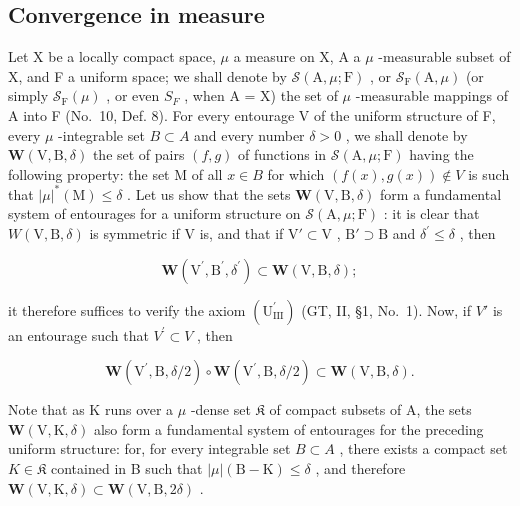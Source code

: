 \subsection{Convergence in measure}

Let X be a locally compact space, \(\mu\) a measure on X, A a \(\mu\) -measurable subset of X, and F a uniform space; we shall denote by \(\mathcal{S}(\mathrm{A},\mu;\mathrm{F})\) , or \(\mathcal{S}_{\mathrm{F}}(\mathrm{A},\mu)\) (or simply \(\mathcal{S}_{\mathrm{F}}(\mu)\) , or even \(S_{F}\) , when A = X) the set of \(\mu\) -measurable mappings of A into F (No.~10, Def. 8). For every entourage V of the uniform structure of F, every \(\mu\) -integrable set \(B \subset A\) and every number \(\delta > 0\) , we shall denote by \(\boldsymbol{W}(\mathrm{V},\mathrm{B},\delta)\) the set of pairs \((f,g)\) of functions in \(\mathcal{S}(\mathrm{A},\mu;\mathrm{F})\) having the following property: the set M of all \(x \in B\) for which \((f(x),g(x)) \notin V\) is such that \(|\mu|^{*}(\mathrm{M}) \leqslant \delta\) . Let us show that the sets \(\boldsymbol{W}(\mathrm{V},\mathrm{B},\delta)\) form a fundamental system of entourages for a uniform structure on \(\mathcal{S}(\mathrm{A},\mu ;\mathrm{F})\) : it is clear that \(W(\mathrm{V},\mathrm{B},\delta)\) is symmetric if V is, and that if \(\mathrm{V}'\subset \mathrm{V}\) , \(\mathrm{B}'\supset \mathrm{B}\) and \(\delta^{\prime}\leqslant \delta\) , then

\[
\boldsymbol {W} \left(\mathrm{V} ^ {\prime}, \mathrm{B} ^ {\prime}, \delta^ {\prime}\right) \subset \boldsymbol {W} (\mathrm{V}, \mathrm{B}, \delta);
\]

it therefore suffices to verify the axiom \((\mathrm{U}_{\mathrm{III}}^{\prime})\) (GT, II, §1, No.~1). Now, if \(V'\) is an entourage such that \(V^{\prime} \subset V\) , then

\[
\boldsymbol {W} \left(\mathrm{V} ^ {\prime}, \mathrm{B}, \delta / 2\right) \circ \boldsymbol {W} \left(\mathrm{V} ^ {\prime}, \mathrm{B}, \delta / 2\right) \subset \boldsymbol {W} (\mathrm{V}, \mathrm{B}, \delta).
\]

Note that as K runs over a \(\mu\) -dense set \(\mathfrak{K}\) of compact subsets of A, the sets \(\boldsymbol{W}(\mathrm{V},\mathrm{K},\delta)\) also form a fundamental system of entourages for the preceding uniform structure: for, for every integrable set \(B\subset A\) , there exists a compact set \(K\in \mathfrak{K}\) contained in B such that \(|\mu|(\mathrm{B}-\mathrm{K})\leqslant\delta\) , and therefore \(\boldsymbol{W}(\mathrm{V},\mathrm{K},\delta)\subset\boldsymbol{W}(\mathrm{V},\mathrm{B},2\delta)\) .

